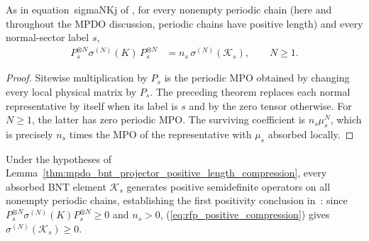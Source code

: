 \begin{lemma}
    \label{thm:mpdo_bnt_projector_positive_length_compression}
    \leanok
    As in equation~\textup{sigmaNKj} of
    \cite[Appendix~C.2, lines~1756--1759]{Cirac2016MPDO_arXiv}, for every
    nonempty periodic chain (here and throughout the MPDO discussion, periodic
    chains have positive length) and every normal-sector label $s$,
    \begin{align}
        P_s^{\otimes N} \sigma^{(N)}(K)\,P_s^{\otimes N}
         & =n_s\,\sigma^{(N)}(\mathcal K_s),
        \qquad N\geq1.
        \label{eq:rfp_positive_compression}
    \end{align}
\end{lemma}

\begin{proof}\leanok
    Sitewise multiplication by $P_s$ is the periodic MPO obtained by changing
    every local physical matrix by $P_s$. The preceding theorem replaces
    each normal representative by itself when its label is $s$ and by the
    zero tensor otherwise. For $N\geq1$, the latter has zero periodic MPO.
    The surviving coefficient is
    $n_s\mu_s^N$, which is precisely $n_s$ times the MPO of the representative
    with $\mu_s$ absorbed locally.
\end{proof}

\begin{lemma}
    \label{cor:mpdo_absorbed_bnt_sector_is_mpdo}
    \leanok
    Under the hypotheses of
    Lemma~\ref{thm:mpdo_bnt_projector_positive_length_compression}, every
    absorbed BNT element $\mathcal K_s$ generates positive semidefinite
    operators on all nonempty periodic chains, establishing the first
    positivity conclusion in~\cite[Appendix~C.2, lines~1753--1759]{Cirac2016MPDO_arXiv}:
    since $P_s^{\otimes N}\sigma^{(N)}(K)P_s^{\otimes N}\geq0$ and $n_s>0$,
    (\ref{eq:rfp_positive_compression}) gives
    $\sigma^{(N)}(\mathcal K_s)\geq0$.
\end{lemma}


